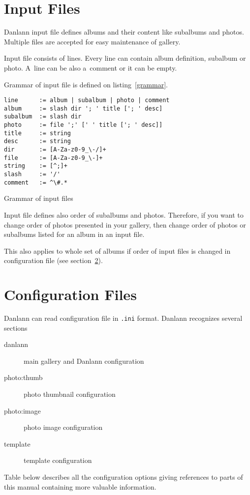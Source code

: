 \documentclass{article}
\begin{document}
\section{Input Files}\label{albums}
Danlann input file defines albums and their content like subalbums and
photos. Multiple files are accepted for easy maintenance of gallery.

Input file consists of lines. Every line can contain album definition,
subalbum or photo. A~line can be also a~comment or it can be empty.

Grammar of input file is defined on listing~\ref{grammar}.

\begin{listing}
\begin{lstlisting}
line      := album | subalbum | photo | comment
album     := slash dir '; ' title ['; ' desc]
subalbum  := slash dir
photo     := file ';' [' ' title ['; ' desc]]
title     := string
desc      := string
dir       := [A-Za-z0-9_\-/]+
file      := [A-Za-z0-9_\-]+
string    := [^;]+
slash     := '/'
comment   := ^\#.*
\end{lstlisting}
\caption{Grammar of input files}\label{grammar}
\end{listing}

Input file defines also order of subalbums and photos. 
Therefore, if you want to change order of photos presented in your gallery, then
change order of photos or subalbums listed for an album in an input file.

This also applies to whole set of albums if order of input files is changed
in configuration file (see section~\ref{conf:all}).

\section{Configuration Files}\label{conf:all}
Danlann can read configuration file in \texttt{.ini} format. Danlann
recognizes several sections
\begin{description}
\item[danlann] main gallery and Danlann configuration
\item[photo:thumb] photo thumbnail configuration
\item[photo:image] photo image configuration
\item[template] template configuration
\end{description}

Table below describes all the configuration options giving references to
parts of this manual containing more valuable information.
\end{document}
